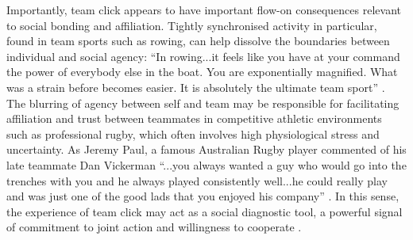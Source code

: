 \begin{CJK}{UTF8}{gbsn}
    Importantly, team click appears to have important flow-on consequences relevant to social bonding and affiliation. Tightly synchronised activity in particular, found in team sports such as rowing, can help dissolve the boundaries between individual and social agency: ``In rowing...it feels like you have at your command the power of everybody else in the boat. You are exponentially magnified. What was a strain before becomes easier. It is absolutely the ultimate team sport'' \citep{Brown2016}.
    The blurring of agency between self and team may be responsible for facilitating affiliation and trust between teammates in competitive athletic environments such as professional rugby, which often involves high physiological stress and uncertainty.  As Jeremy Paul, a famous Australian Rugby player commented of his late teammate Dan Vickerman ``...you always wanted a guy who would go into the trenches with you and he always played consistently well...he could really play and was just one of the good lads that you enjoyed his company'' \citep{Fox-Sports2017}.  In this sense, the experience of team click may act as a social diagnostic tool, a powerful signal of commitment to joint action and willingness to cooperate \citep{Reddish2013a}. \\
    \\
    \\

    \noindent{}


\end{CJK}
